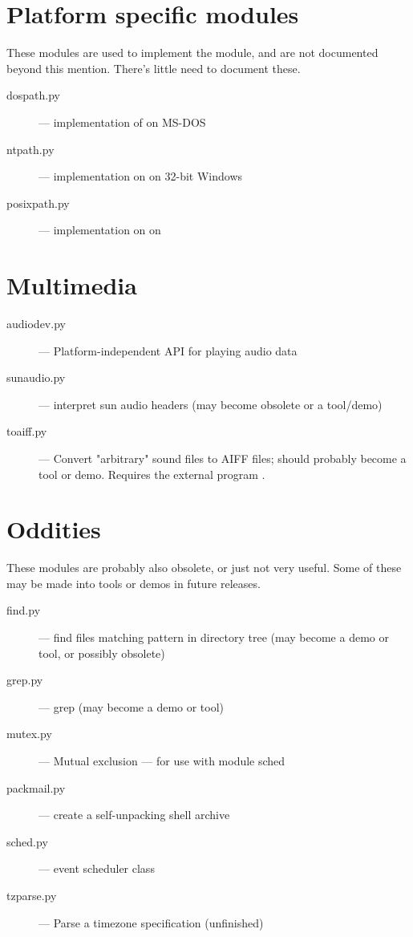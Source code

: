 \section{Platform specific modules}

These modules are used to implement the  module,
and are not documented beyond this mention.  There's little need to
document these.

\begin{description}
\item[dospath.py]
--- implementation of  on MS-DOS

\item[ntpath.py]
--- implementation on  on 32-bit Windows

\item[posixpath.py]
--- implementation on  on \POSIX{}
\end{description}


\section{Multimedia}

\begin{description}
\item[audiodev.py]
--- Platform-independent API for playing audio data

\item[sunaudio.py]
--- interpret sun audio headers (may become obsolete or a tool/demo)

\item[toaiff.py]
--- Convert "arbitrary" sound files to AIFF files; should probably
become a tool or demo.  Requires the external program .
\end{description}


\section{Oddities}

These modules are probably also obsolete, or just not very useful.
Some of these may be made into tools or demos in future releases.

\begin{description}
\item[find.py]
--- find files matching pattern in directory tree (may become a demo
or tool, or possibly obsolete)

\item[grep.py]
--- grep (may become a demo or tool)

\item[mutex.py]
--- Mutual exclusion --- for use with module sched

\item[packmail.py]
--- create a self-unpacking \UNIX{} shell archive

\item[sched.py]
--- event scheduler class

\item[tzparse.py]
--- Parse a timezone specification (unfinished)
\end{description}


